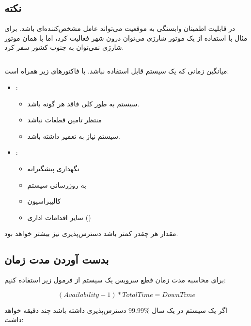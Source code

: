 \documentclass[a4paper]{article}
\begin{document}
\subsection*{نکته}

در قابلیت اطمینان وابستگی به موقعیت می‌تواند عامل مشخص‌کننده‌ای باشد. برای مثال
با استفاده از یک موتور شارژی می‌توان درون شهر فعالیت کرد، اما با همان موتور
شارژی نمی‌توان به جنوب کشور سفر کرد.

\subsection{}

میانگین زمانی که یک سیستم قابل استفاده نباشد.  با فاکتور‌های زیر همراه
است:

\begin{itemize}
    \item {}:
    \begin{itemize}
        \item سیستم به طور کلی فاقد هر گونه  باشد.
        \item منتظر تامین قطعات نباشد
        \item سیستم نیاز به تعمیر داشته باشد.
    \end{itemize}
    \item {}:
    \begin{itemize}
        \item نگهداری پیشگیرانه
        \item به روزرسانی سیستم
        \item کالیبراسیون
        \item سایر اقدامات اداری ()
    \end{itemize}
\end{itemize}

مقدار  هر چقدر کمتر باشد دسترس‌پذیری نیز بیشتر خواهد بود.

\subsection{بدست آوردن مدت زمان }

برای محاسبه مدت زمان قطع سرویس یک سیستم از فرمول زیر استفاده کنیم:

\begin{equation}
    (Availability - 1) * Total Time = DownTime
\end{equation}

اگر یک سیستم در یک سال $99.99\%$ دسترس‌پذیری داشته باشد چند دقیقه 
خواهد داشت:
\end{document}
